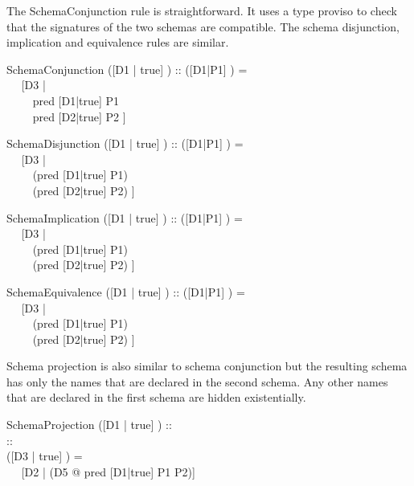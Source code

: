 The SchemaConjunction rule is straightforward.  It uses a type proviso
to check that the signatures of the two schemas are compatible.  The
schema disjunction, implication and equivalence rules are similar.

\begin{zedrule}{SchemaConjunction}
  ([D1 | true] \land [D2 | true]) :: \power [D3 | true]
\derives
  ([D1|P1] \land [D2|P2]) = {}\\~~ [D3 | {}\\~~~~ pred [D1|true] \land P1 \land {}\\~~~~ pred [D2|true] \land P2 ]
\end{zedrule}

\begin{zedrule}{SchemaDisjunction}
  ([D1 | true] \land [D2 | true]) :: \power [D3 | true]
\derives
  ([D1|P1] \lor [D2|P2]) = {}\\~~ [D3 | {}\\~~~~ (pred [D1|true] \land P1) \lor {}\\~~~~ (pred [D2|true] \land P2) ]
\end{zedrule}

\begin{zedrule}{SchemaImplication}
  ([D1 | true] \land [D2 | true]) :: \power [D3 | true]
\derives
  ([D1|P1] \implies [D2|P2]) = {}\\~~ [D3 | {}\\~~~~ (pred [D1|true] \land P1) \implies {}\\~~~~ (pred [D2|true] \land P2) ]
\end{zedrule}

\begin{zedrule}{SchemaEquivalence}
  ([D1 | true] \land [D2 | true]) :: \power [D3 | true]
\derives
  ([D1|P1] \iff [D2|P2]) = {}\\~~ [D3 | {}\\~~~~ (pred [D1|true] \land P1) \iff {}\\~~~~ (pred [D2|true] \land P2) ]
\end{zedrule}

Schema projection is also similar to schema conjunction but the
resulting schema has only the names that are declared in the second
schema.  Any other names that are declared in the first schema are
hidden existentially.

\begin{zedrule}{SchemaProjection}
  ([D1 | true] \land [D2 | true]) :: \power [D3 | true] \\
  [D2 | true] :: \power [D4 | true] \\
  ([D3 | true] \schemaminus [D4 | true]) \is [D5 | true]
\derives
  [D1|P1] \project [D2|P2] = {}\\~~ [D2 | (\exists D5 @ pred [D1|true] \land P1 \land P2)]
\end{zedrule}

